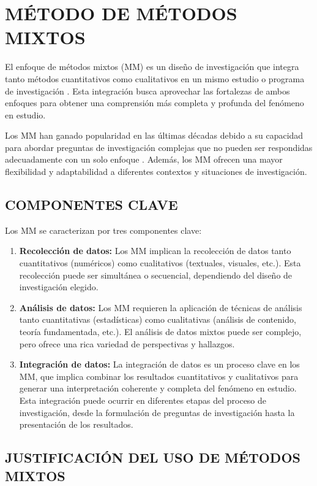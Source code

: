 \section{MÉTODO DE MÉTODOS MIXTOS}

El enfoque de métodos mixtos (MM) es un diseño de investigación que integra tanto métodos cuantitativos como cualitativos en un mismo estudio o programa de investigación \autocite{Creswell2018}. Esta integración busca aprovechar las fortalezas de ambos enfoques para obtener una comprensión más completa y profunda del fenómeno en estudio.

Los MM han ganado popularidad en las últimas décadas debido a su capacidad para abordar preguntas de investigación complejas que no pueden ser respondidas adecuadamente con un solo enfoque \autocite{Johnson2017}. Además, los MM ofrecen una mayor flexibilidad y adaptabilidad a diferentes contextos y situaciones de investigación.

\subsection{COMPONENTES CLAVE}

Los MM se caracterizan por tres componentes clave:

\begin{enumerate}
    \item \textbf{Recolección de datos:} Los MM implican la recolección de datos tanto cuantitativos (numéricos) como cualitativos (textuales, visuales, etc.). Esta recolección puede ser simultánea o secuencial, dependiendo del diseño de investigación elegido.
    \item \textbf{Análisis de datos:} Los MM requieren la aplicación de técnicas de análisis tanto cuantitativas (estadísticas) como cualitativas (análisis de contenido, teoría fundamentada, etc.). El análisis de datos mixtos puede ser complejo, pero ofrece una rica variedad de perspectivas y hallazgos.
    \item \textbf{Integración de datos:} La integración de datos es un proceso clave en los MM, que implica combinar los resultados cuantitativos y cualitativos para generar una interpretación coherente y completa del fenómeno en estudio. Esta integración puede ocurrir en diferentes etapas del proceso de investigación, desde la formulación de preguntas de investigación hasta la presentación de los resultados.
\end{enumerate}

\subsection{JUSTIFICACIÓN DEL USO DE MÉTODOS MIXTOS}

